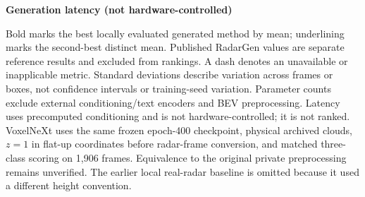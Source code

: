 \begin{table}[t]
\textbf{Generation latency (not hardware-controlled)}\par\smallskip
{}
\medskip
\smallskip
\begin{minipage}{\textwidth}
\footnotesize
Bold marks the best locally evaluated generated method by mean; underlining marks the second-best distinct mean. Published RadarGen values are separate reference results and excluded from rankings. A dash denotes an unavailable or inapplicable metric. Standard deviations describe variation across frames or boxes, not confidence intervals or training-seed variation. Parameter counts exclude external conditioning/text encoders and BEV preprocessing. Latency uses precomputed conditioning and is not hardware-controlled; it is not ranked. VoxelNeXt uses the same frozen epoch-400 checkpoint, physical archived clouds, $z=1$ in flat-up coordinates before radar-frame conversion, and matched three-class scoring on 1,906 frames. Equivalence to the original private preprocessing remains unverified. The earlier local real-radar baseline is omitted because it used a different height convention.
\end{minipage}
\end{table}


